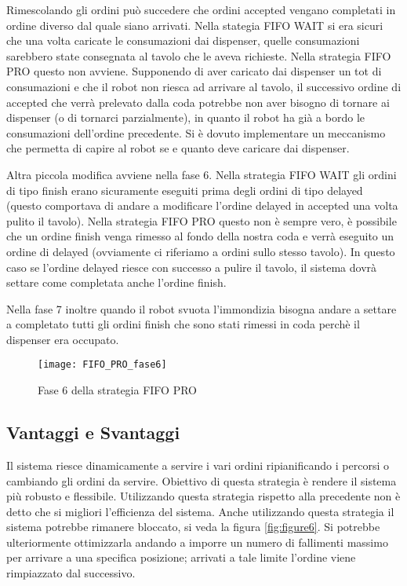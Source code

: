 Rimescolando gli ordini può succedere che ordini accepted vengano completati in ordine diverso dal quale siano arrivati. Nella stategia FIFO WAIT si era sicuri che una volta caricate le consumazioni dai dispenser, quelle consumazioni sarebbero state consegnata al tavolo che le aveva richieste. Nella strategia FIFO PRO questo non avviene. Supponendo di aver caricato dai dispenser un tot di consumazioni e che il robot non riesca ad arrivare al tavolo, il successivo ordine di accepted che verrà prelevato dalla coda potrebbe non aver bisogno di tornare ai dispenser (o di tornarci parzialmente), in quanto il robot ha già a bordo le consumazioni dell'ordine precedente. Si è dovuto implementare un meccanismo che permetta di capire al robot se e quanto deve caricare dai dispenser.

Altra piccola modifica avviene nella fase 6. Nella strategia FIFO WAIT gli ordini di tipo finish erano sicuramente eseguiti prima degli ordini di tipo delayed (questo comportava di andare a modificare l'ordine delayed in accepted una volta pulito il tavolo). Nella strategia FIFO PRO questo non è sempre vero, è possibile che un ordine finish venga rimesso al fondo della nostra coda e verrà eseguito un ordine di delayed (ovviamente ci riferiamo a ordini sullo stesso tavolo). In questo caso se l'ordine delayed riesce con successo a pulire il tavolo, il sistema dovrà settare come completata anche l'ordine finish.

Nella fase 7 inoltre quando il robot svuota l'immondizia bisogna andare a settare a completato tutti gli ordini finish che sono stati rimessi in coda perchè il dispenser era occupato.

\begin{figure}[htp]
  \texttt{[image: FIFO\_PRO\_fase6]}
  \caption{Fase 6 della strategia FIFO PRO}
  \label{fig:figure5}
\end{figure}

\subsection{Vantaggi e Svantaggi}
Il sistema riesce dinamicamente a servire i vari ordini ripianificando i percorsi o cambiando gli ordini da servire. Obiettivo di questa strategia è rendere il sistema più robusto e flessibile. Utilizzando questa strategia rispetto alla precedente non è detto che si migliori l'efficienza del sistema.
Anche utilizzando questa strategia il sistema potrebbe rimanere bloccato, si veda la figura \ref{fig:figure6}. Si potrebbe ulteriormente ottimizzarla andando a imporre un numero di fallimenti massimo per arrivare a una specifica posizione; arrivati a tale limite l'ordine viene rimpiazzato dal successivo.

